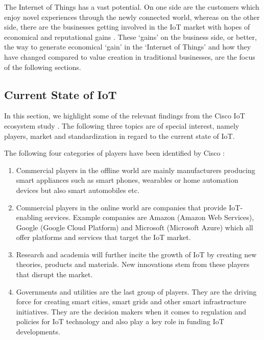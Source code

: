 	The Internet of Things has a vast potential. On one side are the customers which enjoy novel experiences through the newly connected world, whereas on the other side, there are the businesses getting involved in the IoT market with hopes of economical and reputational gains \cite{ju}. These `gains' on the business side, or better, the way to generate economical `gain' in the `Internet of Things' and how they have changed compared to value creation in traditional businesses, are the focus of the following sections.

	\subsection{Current State of IoT}
		In this section, we highlight some of the relevant findings from the Cisco IoT ecosystem study \cite{cisco}. The following three topics are of special interest, namely players, market and standardization in regard to the current state of IoT.

		The following four categories of players have been identified by Cisco \cite{cisco}: 

		\begin{enumerate}
			\item Commercial players in the offline world are mainly manufacturers producing smart appliances such as smart phones, wearables or home automation devices but also smart automobiles etc.

			\item Commercial players in the online world are companies that provide IoT-enabling services. Example companies are Amazon (Amazon Web Services), Google (Google Cloud Platform) and Microsoft (Microsoft Azure) which all offer platforms and services that target the IoT market.

			\item Research and academia will further incite the growth of IoT by creating new theories, products and materials. New innovations stem from these players that disrupt the market.

			\item Governments and utilities are the last group of players. They are the driving force for creating smart cities, smart grids and other smart infrastructure initiatives. They are the decision makers when it comes to regulation and policies for IoT technology and also play a key role in funding IoT developments.
		\end{enumerate}
		 			
		\newpage
		 			
